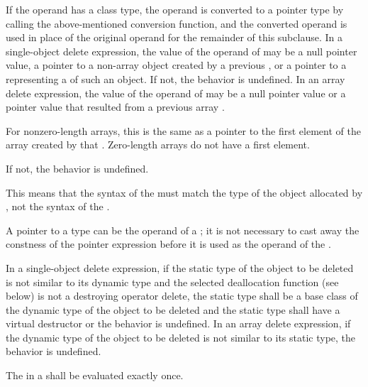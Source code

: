 \pnum
{}%
If the operand has a class type, the operand is converted to a pointer
type by calling the above-mentioned conversion function, and the
converted operand is used in place of the original operand for the
remainder of this subclause.
In a single-object delete expression, the value of the operand of
 may be a null pointer value, a pointer to a non-array object
created by a previous ,
or a pointer to a
 representing a
 of such an
object. If not, the behavior is undefined.
%
In an array delete expression, the value of the operand of 
may be a null pointer value or a pointer value that resulted from
a previous array .
\begin{footnote}
For nonzero-length
arrays, this is the same as a pointer to the first
element of the array created by that .
Zero-length arrays do not have a first element.
\end{footnote}
If not, the behavior is undefined.
\begin{note}
This means that the syntax of the  must
match the type of the object allocated by , not the syntax of the
.
\end{note}
\begin{note}
A pointer to a  type can be the operand of a
; it is not necessary to cast away the
constness of the pointer expression before it is
used as the operand of the .
\end{note}

\pnum
{}%
In a single-object delete expression, if the static type of the object to be
deleted is not similar to its dynamic type
and the selected deallocation function (see below)
is not a destroying operator delete,
the static type shall be a base
class of the dynamic type of the object to be deleted and the static type shall
have a virtual destructor or the behavior is undefined. In an array delete
expression, if the dynamic type of the object to be deleted is not similar to
its static type, the behavior is undefined.

\pnum
The  in a  shall
be evaluated exactly once.

